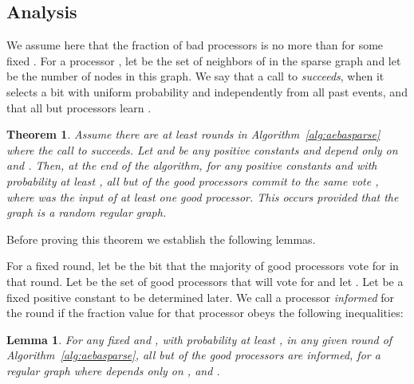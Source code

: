 \documentclass[letterpaper,11pt]{article}
\newtheorem{theorem}{Theorem}
\newtheorem{lemma}{Lemma}
\begin{document}
\subsection{Analysis}

We assume here that the fraction of bad processors is no more than  for some fixed .  For a processor , let  be the set of neighbors of  in the sparse graph  and let  be the number of nodes in this graph.  We say that a call to  \emph{succeeds}, when it selects a bit  with uniform probability and independently from all past events, and that all but  processors learn .

\begin{theorem} Assume there are at least  rounds in Algorithm~\ref{alg:aebasparse} where the call to  succeeds.  Let  and  be any positive constants and  depend only on  and .  Then, at the end of the algorithm, for any positive constants  and  with probability at least , all but  of the good processors commit to the same vote , where  was the input of at least one good processor.   This occurs provided that the graph  is a random  regular graph.
\end{theorem}

Before proving this theorem we establish the following lemmas.

For a fixed round, let  be the bit that the majority of good processors vote for in that round.  Let  be the set of good processors that will vote for  and let .  Let  be a fixed positive constant to be determined later.  We call a processor \emph{informed} for the round if the fraction value for that processor obeys the following inequalities:



\begin{lemma}
For any fixed  and , with probability at least , in any given round of Algorithm~\ref{alg:aebasparse}, all but  of the good processors are informed, for  a  regular graph where  depends only on ,  and . 
\end{lemma}
\end{document}
